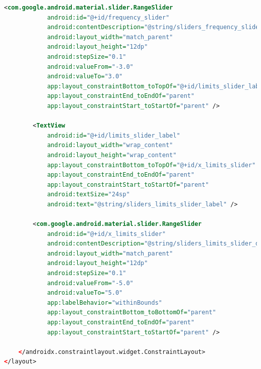 \documentclass[oneside,solution]{android-assign}
\begin{document}
\begin{lstlisting}[language=xml]
        <com.google.android.material.slider.RangeSlider
            android:id="@+id/frequency_slider"
            android:contentDescription="@string/sliders_frequency_slider_description"
            android:layout_width="match_parent"
            android:layout_height="12dp"
            android:stepSize="0.1"
            android:valueFrom="-3.0"
            android:valueTo="3.0"
            app:layout_constraintBottom_toTopOf="@+id/limits_slider_label"
            app:layout_constraintEnd_toEndOf="parent"
            app:layout_constraintStart_toStartOf="parent" />

        <TextView
            android:id="@+id/limits_slider_label"
            android:layout_width="wrap_content"
            android:layout_height="wrap_content"
            app:layout_constraintBottom_toTopOf="@+id/x_limits_slider"
            app:layout_constraintEnd_toEndOf="parent"
            app:layout_constraintStart_toStartOf="parent"
            android:textSize="24sp"
            android:text="@string/sliders_limits_slider_label" />

        <com.google.android.material.slider.RangeSlider
            android:id="@+id/x_limits_slider"
            android:contentDescription="@string/sliders_limits_slider_description"
            android:layout_width="match_parent"
            android:layout_height="12dp"
            android:stepSize="0.1"
            android:valueFrom="-5.0"
            android:valueTo="5.0"
            app:labelBehavior="withinBounds"
            app:layout_constraintBottom_toBottomOf="parent"
            app:layout_constraintEnd_toEndOf="parent"
            app:layout_constraintStart_toStartOf="parent" />

    </androidx.constraintlayout.widget.ConstraintLayout>
</layout> 
\end{lstlisting}
\end{document}
